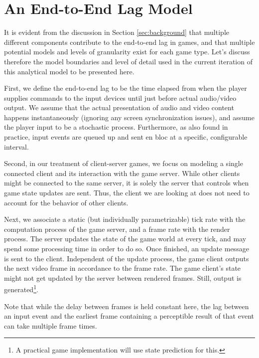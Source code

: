 \section{An End-to-End Lag Model}
\label{sec:model}

It is evident from the discussion in Section \ref{sec:background} 
that multiple different components contribute to 
the end-to-end lag in games, and that multiple potential models and 
levels of granularity exist for each game type.
Let's discuss therefore the model boundaries and level of detail 
used in the current iteration of this analytical model to be presented here.

First, we define the end-to-end lag to be the time elapsed 
from when the player supplies commands to the input devices until just 
before actual audio/video output.
We assume that the actual presentation of 
audio and video content happens instantaneously  
(ignoring any screen synchronization issues), and assume the player 
input to be a stochastic process. %
Furthermore, as also found in practice, input events are queued up  
and sent en bloc at a specific, configurable interval.

Second, in our treatment of client-server games, we focus on modeling 
a single connected client and its interaction with the game server. 
While other clients might be connected to the same server, it is 
solely the server that controls when game state updates are sent. 
Thus, the client we are looking at does not need to account for the 
behavior of other clients.

Next, we associate a static (but individually parametrizable) tick 
rate with the computation process of the game server, and a frame rate 
with the render process. 
The server updates the state of the game world at every tick, and may 
spend some processing time in order to do so. Once finished, an update 
message is sent to the client.
Independent of the update process, the game client outputs the next 
video frame in accordance to the frame rate. The game client's state 
might not get updated by the server between rendered frames. Still, 
output is generated\footnote{A practical game implementation will use state prediction for this.}.

Note that while the delay between frames is held constant here,
the lag between an input event and the earliest frame containing a perceptible 
result of that event can take multiple frame times.

